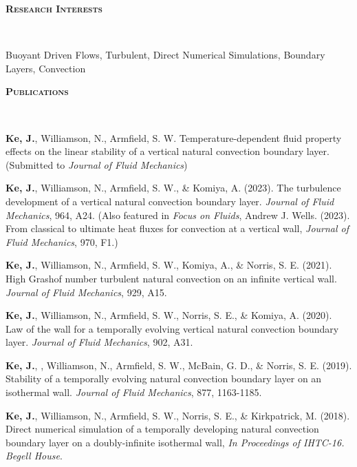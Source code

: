 \documentclass[letterpaper, 10pt]{article}
\newenvironment{changemargin}[2]{%
  \begin{list}{}{%
      \setlength{\topsep}{0pt}%
      \setlength{\leftmargin}{#1}%
      \setlength{\rightmargin}{#2}%
      \setlength{\listparindent}{\parindent}%
      \setlength{\itemindent}{\parindent}%
      \setlength{\parsep}{\parskip}%
    }%
  \item[]}{\end{list}
}
\newcommand{\lineover}{
  \begin{changemargin}{-0.05in}{-0.05in}
    \vspace*{-8pt}
    \hrulefill \\
    \vspace*{-2pt}
  \end{changemargin}
}
\newcommand{\header}[1]{
  \begin{changemargin}{-0.5in}{-0.5in}
    \textbf{\scshape{#1}}\\
    \lineover
  \end{changemargin}
}
\newenvironment{body} {
  \vspace*{-16pt}
  \begin{changemargin}{-0.25in}{-0.5in}
  }
  {\end{changemargin}
}
\begin{document}
\header{Research Interests}
Buoyant Driven Flows, Turbulent, Direct Numerical Simulations, Boundary Layers, Convection
\smallskip



\header{Publications}
\begin{body}
  \vspace{14pt}
  
  \textbf{Ke, J.}, Williamson, N., Armfield, S. W. Temperature-dependent fluid property effects on the linear stability of a vertical natural convection boundary layer. (Submitted to \emph{Journal of Fluid Mechanics})
  
  \smallskip
  
  \textbf{Ke, J.}, Williamson, N., Armfield, S. W., \& Komiya, A. (2023). The turbulence development of a vertical natural convection boundary layer. \emph{Journal of Fluid Mechanics}, 964, A24. (Also featured in \emph{Focus on Fluids}, Andrew J. Wells. (2023). From classical to ultimate heat fluxes for convection at a vertical wall, \emph{Journal of Fluid Mechanics}, 970, F1.)
  
  \smallskip
    
  \textbf{Ke, J.}, Williamson, N., Armfield, S. W., Komiya, A., \& Norris, S. E. (2021).  High Grashof number turbulent natural convection on an infinite vertical wall. \emph{Journal of Fluid Mechanics}, 929, A15.
  
  \smallskip
  
  \textbf{Ke, J.}, Williamson, N., Armfield, S. W., Norris, S. E., \& Komiya, A.  (2020). Law of the wall for a temporally evolving vertical natural convection boundary layer. \emph{Journal of Fluid Mechanics}, 902, A31.
  
  \smallskip

  \textbf{Ke, J.}, , Williamson, N., Armfield, S. W., McBain, G. D., \& Norris, S. E. (2019). Stability of a temporally evolving natural convection boundary layer on an isothermal wall. \emph{Journal of Fluid Mechanics}, 877, 1163-1185.

  \smallskip

  \textbf{Ke, J.}, Williamson, N., Armfield, S. W., Norris, S. E., \& Kirkpatrick, M. (2018). Direct numerical simulation of a temporally developing natural convection boundary layer on a doubly-infinite isothermal wall, \emph{In Proceedings of IHTC-16. Begell House}. %
  

\end{body}
\smallskip
\end{document}
